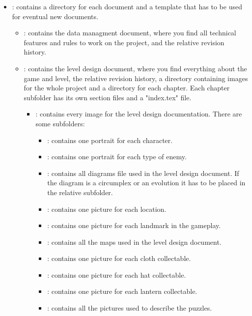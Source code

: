 \begin{itemize}
\item \textbf{}: contains a directory for each document and a template that has to be used for eventual new documents.
  \begin{itemize}
    \item \textbf{}: contains the data managment document, where you find all technical features and rules to work on the project, and the relative revision history.

    \item \textbf{}: contains the level design document, where you find everything about the game and level, the relative revision history, a directory containing images for the whole project and a directory for each chapter. Each chapter subfolder has its own section files and a "index.tex" file.
    \begin{itemize}
    \item \textbf{}: contains every image for the level design documentation. There are some subfolders:
    \begin{itemize}
    \item \textbf{}: contains one portrait for each character.
      \item \textbf{}: contains one portrait for each type of enemy.
      \item \textbf{}: contains all diagrams file used in the level design document. If the diagram is a circumplex or an evolution it has to be placed in the relative subfolder.
      \item \textbf{}: contains one picture for each location.
        \item \textbf{}: contains one picture for each landmark in the gameplay.
        \item \textbf{}: contains all the maps used in the level design document.
        \item \textbf{}: contains one picture for each cloth collectable.
        \item \textbf{}: contains one picture for each hat collectable.
        \item \textbf{}: contains one picture for each lantern collectable.
        \item \textbf{}: contains all the pictures used to describe the puzzles.

\end{itemize}
\end{itemize}
\end{itemize}
\end{itemize}
